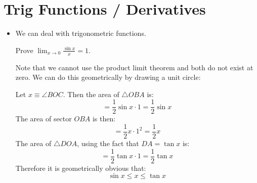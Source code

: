 \section{Trig Functions / Derivatives}
\begin{itemize}
    \item We can deal with trigonometric functions.
    \begin{example}
        Prove $\displaystyle \lim_{x\to 0} \frac{\sin x}{x}=1$.
        \vspace{2mm}

        Note that we cannot use the product limit theorem and both do not exist at zero. We can do this geometrically by drawing a unit circle:
        \begin{center}
        \end{center}
        Let $x\equiv \angle BOC$. Then the area of $\triangle OBA$ is:
        \begin{equation}
            [\triangle OBA] = \frac{1}{2}\sin x \cdot 1 = \frac{1}{2}\sin x
            \label{eq:}
        \end{equation}
        The area of sector $OBA$ is then:
        \begin{equation}
            [OBA] = \frac{1}{2}x\cdot 1^2 = \frac{1}{2}x
            \label{eq:}
        \end{equation}
        The area of $\triangle DOA$, using the fact that $DA=\tan x$ is:
        \begin{equation}
            [\triangle DOA] = \frac{1}{2}\tan x \cdot 1 = \frac{1}{2}\tan x
            \label{eq:}
        \end{equation}
        Therefore it is geometrically obvious that:
        \begin{equation}
            \sin x \le x \le \tan x
            \label{eq:}
        \end{equation}

\end{example}
\end{itemize}

